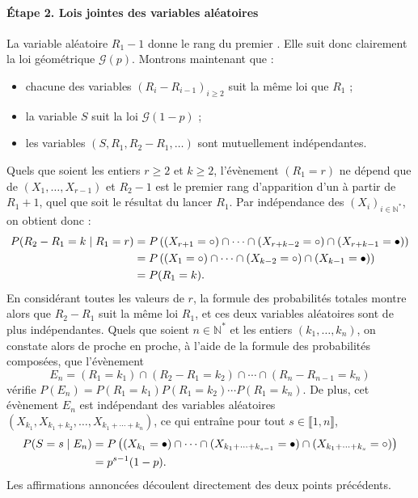 \paragraph{\'Etape 2. Lois jointes des variables aléatoires}
La variable aléatoire $R_1 - 1$ donne le rang du premier \pile{}. Elle suit donc clairement la loi géométrique $\mathscr G(p)$. Montrons maintenant que :
\begin{itemize}
    \item chacune des variables $(R_i-R_{i-1})_{i\geqslant 2}$ suit la même loi que $R_1$ ;
    \item la variable $S$ suit la loi $\mathscr G(1-p)$ ;
    \item les variables $(S,R_1,R_2-R_1,\dots)$ sont mutuellement indépendantes.
\end{itemize}
Quels que soient les entiers $r \geqslant 2$ et $k \geqslant 2$, l'évènement $(R_1=r)$
ne dépend que de $(X_1,\dots,X_{r-1})$ et $R_2 - 1$ est le premier rang d'apparition d'un \pile{} à partir de $R_1 + 1$, quel que soit le résultat du lancer $R_1$.
Par indépendance des $(X_i)_{i\in\mathbb N^*}$, on obtient donc  :
\begin{align*}
P(R_2 - R_1 = k \mid R_1 = r) &= P\left((X_{r+1} = \circ) \cap \cdots \cap (X_{r+k-2} = \circ) \cap (X_{r+k-1}=\bullet)\right)\\
    & = P\left((X_{1} = \circ) \cap \cdots \cap (X_{k-2} = \circ) \cap (X_{k-1}=\bullet)\right)\\
    & = P(R_1 =k).
\end{align*}
En considérant toutes les valeurs de $r$, la formule des probabilités totales montre alors que $R_2 - R_1$ suit la même loi $R_1$, et ces deux variables aléatoires sont de plus indépendantes.
Quels que soient $n\in \mathbb N^*$ et les entiers $(k_1,\dots,k_n)$, on constate alors de proche en proche, à l'aide de la formule des probabilités composées, que l'évènement 
\[
E_n = (R_1 = k_1) \cap (R_2-R_1 = k_2) \cap \cdots \cap (R_n - R_{n-1} = k_n)
\]
vérifie $P(E_n) = P(R_1=k_1) P(R_1=k_2)\cdots P(R_1=k_n)$.
De plus, cet évènement $E_n$ est indépendant des variables aléatoires $(X_{k_1},X_{k_1+k_2},\dots,X_{k_1+\cdots + k_n})$, ce qui entraîne pour tout $s \in \llbracket1,n\rrbracket$,
\begin{align*}
P(S = s\mid E_n) &= P\left((X_{k_1} = \bullet{}) \cap \cdots \cap (X_{k_1+\cdots+k_{s-1}}= \bullet{})\cap (X_{k_1+\cdots + k_s} = \circ{})\right)\\
&= p^{s-1}(1-p).
\end{align*}
Les affirmations annoncées découlent directement des deux points précédents.

